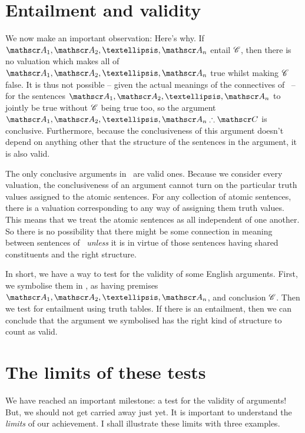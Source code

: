 \section{Entailment and validity} \label{s:entailvalid}

We now make an important observation:
Here's why. If $\meta{A}_1, \meta{A}_2, …, \meta{A}_n$ entail $\mathscr{C}$, then there is no valuation which makes all of $\meta{A}_1, \meta{A}_2, …, \meta{A}_n$ true whilst making $\mathscr{C}$ false. It is thus not possible – given the actual meanings of the connectives of \TFL\ – for the sentences $\meta{A}_1, \meta{A}_2, …, \meta{A}_n$ to jointly be true without $\mathscr{C}$ being true too, so the argument $\meta{A}_1, \meta{A}_2, …, \meta{A}_n\ttherefore \meta{C}$ is conclusive. Furthermore, because the conclusiveness of this argument doesn't depend on anything other that the structure of the sentences in the argument, it is also valid. 

The only conclusive arguments in \TFL\ are valid ones. Because we consider every valuation, the conclusiveness of an argument cannot turn on the particular truth values assigned to the  atomic sentences. For any collection of atomic sentences, there is a valuation corresponding to any way of assigning them truth values. This means that we treat the atomic sentences as all independent of one another. So there is no possibility that there might be some connection in meaning between sentences of \TFL\ \emph{unless} it is in virtue of those sentences having shared constituents and the right structure.   

In short, we have a way to test for the validity of some English arguments. First, we symbolise them in \TFL, as having premises $\meta{A}_1, \meta{A}_2, …, \meta{A}_n$, and conclusion $\mathscr{C}$. Then we test for entailment using truth tables. If there is an entailment, then we can conclude that the argument we symbolised has the right kind of structure to count as valid.


\section{The limits of these tests}\label{s:ParadoxesOfMaterialConditional}
We have reached an important milestone: a test for the validity of arguments! But, we should not get carried away just yet. It is important to understand the \emph{limits} of our achievement. I shall illustrate these limits with three examples.


